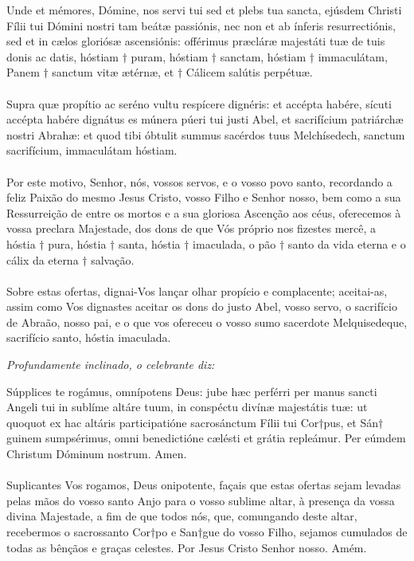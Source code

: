 \begin{multicols}{2}
	\noindent Unde et mémores, Dómine, nos servi tui sed et plebs tua sancta, ejúsdem Christi Fílii tui Dómini nostri tam beátæ passiónis, nec non et ab ínferis resurrectiónis, sed et in cælos gloriósæ ascensiónis: offérimus præcláræ majestáti tuæ de tuis donis ac datis, hóstiam $\dag$ puram, hóstiam $\dag$ sanctam, hóstiam $\dag$ immaculátam, Panem $\dag$ sanctum vitæ ætérnæ, et $\dag$ Cálicem salútis perpétuæ. 
	\\
	\\ Supra quæ propítio ac seréno vultu respícere dignéris: et accépta habére, sícuti accépta habére dignátus es múnera púeri tui justi Abel, et sacrifícium patriárchæ nostri Abrahæ: et quod tibi óbtulit summus sacérdos tuus Melchísedech, sanctum sacrifícium, immaculátam hóstiam.
	\\
	\\ Por este motivo, Senhor, nós, vossos servos, e o vosso povo santo, recordando a feliz Paixão do mesmo Jesus Cristo, vosso Filho e Senhor nosso, bem como a sua Ressurreição de entre os mortos e a sua gloriosa Ascenção aos céus, oferecemos à vossa preclara Majestade, dos dons de que Vós próprio nos fizestes mercê, a hóstia $\dag$ pura, hóstia $\dag$ santa, hóstia $\dag$ imaculada, o pão $\dag$ santo da vida eterna e o cálix da eterna $\dag$ salvação.
	\\
	\\ Sobre estas ofertas, dignai-Vos lançar olhar propício e complacente; aceitai-as, assim como Vos dignastes aceitar os dons do justo Abel, vosso servo, o sacrifício de Abraão, nosso pai, e o que vos ofereceu o vosso sumo sacerdote Melquisedeque, sacrifício santo, hóstia imaculada.
\end{multicols}
\begin{flushleft}
	\textit{Profundamente inclinado, o celebrante diz:}
\end{flushleft}
\begin{multicols}{2}
	\noindent Súpplices te rogámus, omnípotens Deus: jube hæc perférri per manus sancti Angeli tui in sublíme altáre tuum, in conspéctu divínæ majestátis tuæ: ut quoquot ex hac altáris participatióne sacrosánctum Fílii tui Cor$\dag$pus, et Sán$\dag$guinem sumpsérimus, omni benedictióne cælésti et grátia repleámur. Per eúmdem Christum Dóminum nostrum. Amen.
	\\
	\\ Suplicantes Vos rogamos, Deus onipotente, façais que estas ofertas sejam levadas pelas mãos do vosso santo Anjo para o vosso sublime altar, à presença da vossa divina Majestade, a fim de que todos nós, que, comungando deste altar, recebermos o sacrossanto Cor$\dag$po e San$\dag$gue do vosso Filho, sejamos cumulados de todas as bênçãos e graças celestes. Por Jesus Cristo Senhor nosso. Amém.
\end{multicols}
